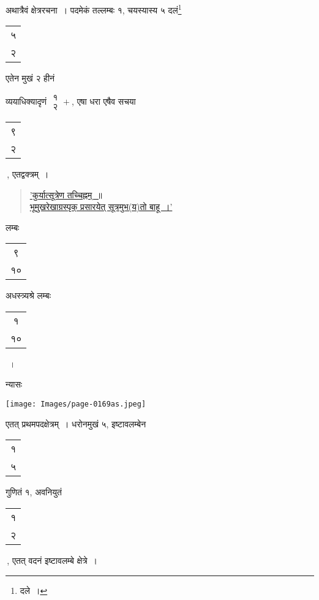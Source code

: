 \documentclass[10pt, openany]{book}
\begin{document}
{{{{अथात्रैवं क्षेत्ररचना~। पदमेकं तल्लम्बः १, चयस्यास्य ५ दलं\renewcommand{\thefootnote}{१८}\footnote{दले~।}\begin{tabular}{c}५\\ २\end{tabular}एतेन मुखं २ हीनं}
{व्ययाधिक्यादृणं $\begin{matrix}
\mbox{{१}}\\
\mbox{{२}}
\end{matrix}+$, एषा धरा एषैव सचया \begin{tabular}{|c|} ९\\ २\\\hline \end{tabular}\,, एतद्वक्त्रम्~।}

\begin{quote}
\hspace{3cm} \hyperref[81]{'कुर्यात्सूत्रेण तच्चिह्नम्~॥}\\
\hyperref[82]{भूमुखरेखाग्रस्पृक् प्रसारयेत् सूत्रमुभ(य)तो बाहू~।'} 
\end{quote}

\newpage

{लम्बः \begin{tabular} {|c|}९\\ १०\\\hline \end{tabular}	अधस्त्र्यश्रे लम्बः \begin{tabular}{|c|} १\\ १०\\\hline \end{tabular}}~।
\vspace{4mm}

{न्यासः\textendash \,}
\vspace{-2mm}

\hspace{10mm} \texttt{[image: Images/page-0169as.jpeg]}
\vspace{4mm}

{एतत् प्रथमपदक्षेत्रम्~। धरोनमुखं ५, इष्टावलम्बेन \begin{tabular}{|c|} १\\ ५\\\hline \end{tabular}  गुणितं १,
अवनियुतं \begin{tabular}{|c|}१\\ २\\\hline \end{tabular}\,, एतत् वदनं इष्टावलम्बे क्षेत्रे~।}
\vspace{3mm}

}}}
\end{document}
